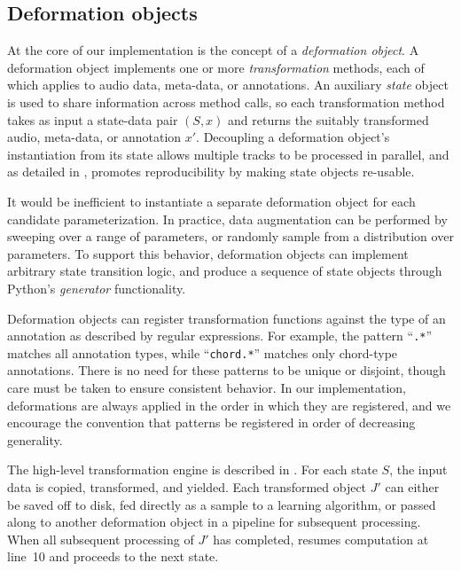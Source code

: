 \documentclass{article}
\begin{document}
\subsection{Deformation objects}

At the core of our implementation is the concept of a \emph{deformation object}.
A deformation object implements one or more \emph{transformation} methods, each of which
applies to audio data, meta-data, or annotations.  An auxiliary \emph{state} object is used
to share information across method calls, so each transformation method takes as input a
state-data pair $(S, x)$ and returns the suitably transformed audio, meta-data, or
annotation $x'$.  Decoupling a deformation object's instantiation from
its state allows multiple tracks to be processed in parallel, and as detailed in
, promotes reproducibility by making state objects re-usable.

It would be inefficient to instantiate a separate deformation object for each
candidate parameterization.
In practice, data augmentation can be performed by sweeping over a range of
parameters, or randomly sample from a distribution over parameters.  To support this
behavior, deformation objects can implement arbitrary state transition logic, and produce
a sequence of state objects through Python's \emph{generator} functionality.

Deformation objects can register transformation functions against the type of an
annotation as described by regular expressions.  For example, the pattern ``\texttt{.*}''
matches all annotation types, while ``\texttt{chord.*}'' matches only chord-type
annotations.
There is no need for these patterns to be unique or disjoint, though care must be taken
to ensure consistent behavior.  In our implementation, deformations are always applied in the
order in which they are registered, and we encourage the convention that patterns be
registered in order of decreasing generality.

The high-level transformation engine is described in
.  For each state $S$, the input data is copied, transformed,
and yielded.  Each transformed object $J'$ can either be saved off to disk, fed directly
as a sample to a learning algorithm, or passed along to another deformation object in a
pipeline for subsequent processing.  When all subsequent processing of $J'$ has
completed,  resumes computation at line~10 and proceeds to the
next state.
\end{document}
